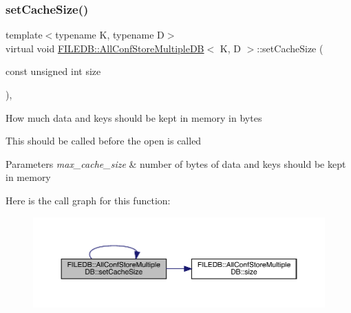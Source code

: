 \subsubsection{\texorpdfstring{setCacheSize()}{setCacheSize()}\hspace{0.1cm}{\footnotesize\ttfamily [1/3]}}
{\footnotesize\ttfamily template$<$typename K, typename D$>$ \\
virtual void \mbox{\hyperlink{classFILEDB_1_1AllConfStoreMultipleDB}{F\+I\+L\+E\+D\+B\+::\+All\+Conf\+Store\+Multiple\+DB}}$<$ K, D $>$\+::set\+Cache\+Size (\begin{DoxyParamCaption}\item[{const unsigned int}]{size }\end{DoxyParamCaption})\hspace{0.3cm}{\ttfamily [inline]}, {\ttfamily [virtual]}}

How much data and keys should be kept in memory in bytes

This should be called before the open is called 
\begin{DoxyParams}{Parameters}
{\em max\+\_\+cache\+\_\+size} & number of bytes of data and keys should be kept in memory \\
\hline
\end{DoxyParams}
Here is the call graph for this function\+:
\nopagebreak
\begin{figure}[H]
\begin{center}
\leavevmode
\includegraphics[width=350pt]{d5/dbe/classFILEDB_1_1AllConfStoreMultipleDB_a746ef51b2dedf529a8e85528c0d31bfc_cgraph}
\end{center}
\end{figure}
\mbox{\label{classFILEDB_1_1AllConfStoreMultipleDB_a746ef51b2dedf529a8e85528c0d31bfc}} 
